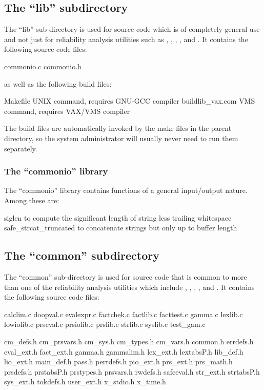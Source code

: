 \subsection{The ``lib'' subdirectory}

The ``lib'' sub-directory is used for source code which is of completely
general use and not just for reliability analysis utilities such as
, , , ,
and .   It contains the following source code files:
\begin{codeexample}
commonio.c
commonio.h
\end{codeexample}
as well as the following build files:
\begin{codeexample}
Makefile          {\scriptsize UNIX command, requires GNU-GCC compiler}
buildlib_vax.com  {\scriptsize VMS command, requires VAX/VMS compiler}
\end{codeexample}
The build files are automatically invoked by the make files in the
parent directory, so the system administrator will usually never need to
run them separately.

\subsubsection{The ``commonio'' library}
\label{sec:commonio}
The ``commonio'' library contains functions of a general input/output nature.
Among these are:
\begin{codeexample}
siglen                 {\scriptsize to compute the significant length of string less trailing whitespace}
safe_strcat_truncated  {\scriptsize to concatenate strings but only up to buffer length}
\end{codeexample}


\subsection{The ``common'' subdirectory}

The ``common'' sub-directory
is used for source code that is common to more than
one of the reliability analysis utilities which include
, , , ,
and .   It contains the following source code files:
\begin{codeexample}
calclim.c
doopval.c
evalexpr.c
factchek.c
factlib.c
facttest.c
gamma.c
lexlib.c
lowiolib.c
prseval.c
prsiolib.c
prslib.c
strlib.c
syslib.c
test_gam.c

cm_defs.h
cm_prsvars.h
cm_sys.h
cm_types.h
cm_vars.h
common.h
errdefs.h
eval_ext.h
fact_ext.h
gamma.h
gammalim.h
lex_ext.h
lextabsP.h
lib_def.h
lio_ext.h
main_def.h
pass.h
perrdefs.h
pio_ext.h
prs_ext.h
prs_math.h
prsdefs.h
prstabsP.h
prstypes.h
prsvars.h
rwdefs.h
safeeval.h
str_ext.h
strtabsP.h
sys_ext.h
tokdefs.h
user_ext.h
x_stdio.h
x_time.h
\end{codeexample}

